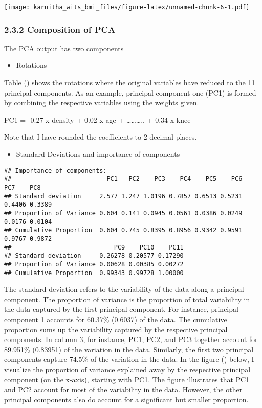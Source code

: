 \documentclass[
]{article}
\providecommand{\tightlist}{%
  \setlength{\itemsep}{0pt}\setlength{\parskip}{0pt}}
\begin{document}
\begin{landscape}

\texttt{[image: karuitha\_wits\_bmi\_files/figure-latex/unnamed-chunk-6-1.pdf]}

\end{landscape}

\hypertarget{composition-of-pca}{%
\subsubsection{\texorpdfstring{\textbf{2.3.2 Composition of
PCA}}{2.3.2 Composition of PCA}}\label{composition-of-pca}}

The PCA output has two components

\begin{itemize}
\tightlist
\item
  Rotations
\end{itemize}

Table () shows the rotations where the original variables have reduced
to the 11 principal components. As an example, principal component one
(PC1) is formed by combining the respective variables using the weights
given.

PC1 = -0.27 x density + 0.02 x age + \ldots\ldots\ldots.. + 0.34 x knee

Note that I have rounded the coefficients to 2 decimal places.

\begin{itemize}
\tightlist
\item
  Standard Deviations and importance of components
\end{itemize}

\begin{verbatim}
## Importance of components:
##                          PC1   PC2    PC3    PC4    PC5    PC6    PC7    PC8
## Standard deviation     2.577 1.247 1.0196 0.7857 0.6513 0.5231 0.4406 0.3389
## Proportion of Variance 0.604 0.141 0.0945 0.0561 0.0386 0.0249 0.0176 0.0104
## Cumulative Proportion  0.604 0.745 0.8395 0.8956 0.9342 0.9591 0.9767 0.9872
##                            PC9    PC10    PC11
## Standard deviation     0.26278 0.20577 0.17290
## Proportion of Variance 0.00628 0.00385 0.00272
## Cumulative Proportion  0.99343 0.99728 1.00000
\end{verbatim}

The standard deviation refers to the variability of the data along a
principal component. The proportion of variance is the proportion of
total variability in the data captured by the first principal component.
For instance, principal component 1 accounts for 60.37\% (0.6037) of the
data. The cumulative proportion sums up the variability captured by the
respective principal components. In column 3, for instance, PC1, PC2,
and PC3 together account for 89.951\% (0.83951) of the variation in the
data. Similarly, the first two principal components capture 74.5\% of
the variation in the data. In the figure () below, I visualize the
proportion of variance explained away by the respective principal
component (on the x-axis), starting with PC1. The figure illustrates
that PC1 and PC2 account for most of the variability in the data.
However, the other principal components also do account for a
significant but smaller proportion.
\end{document}
